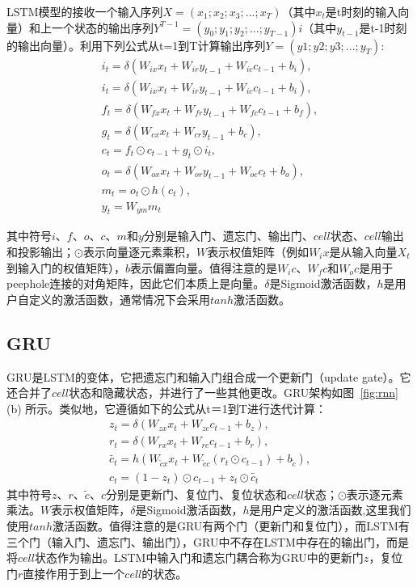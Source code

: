 LSTM模型的接收一个输入序列$X=(x_1;x_2;x_3;...;x_T)$（其中$x_t$是t时刻的输入向量）和上一个状态的输出序列$Y^{T-1}=(y_0;y_1;y_2;...;y_{T-1})i$（其中$y_{t-1}$是t-1时刻的输出向量）。利用下列公式从t=1到T计算输出序列$Y=(y1;y2;y3;...;y_T)$:
\begin{gather}
i_t=\delta (W_{ix}x_t + W_{ir}y_{t-1} + W_{ic}c_{t-1} + b_i), \\
i_t=\delta (W_{ix}x_t + W_{ir}y_{t-1} + W_{ic}c_{t-1} + b_i), \\
f_t=\delta (W_{fx}x_t + W_{fr}y_{t-1} + W_{fc}c_{t-1} + b_f), \\
g_t=\delta (W_{cx}x_t + W_{cr}y_{t-1} + b_c), \\
c_t=f_t \odot c_{t-1} + g_t \odot i_t, \\
o_t=\delta (W_{ox}x_t + W_{or}y_{t-1} + W_{oc}c_{t} + b_o), \\
m_t=o_t \odot h(c_t), \\
y_t=W_{ym}m_t 
\end{gather}

其中符号$i$、$f$、$o$、$c$、$m$和$y$分别是输入门、遗忘门、输出门、$cell$状态、$cell$输出和投影输出；$\odot$表示向量逐元素乘积，$W$表示权值矩阵（例如$W_ix$是从输入向量$X_t$到输入门的权值矩阵），$b$表示偏置向量。值得注意的是$W_ic$、$W_fc$和$W_oc$是用于peephole连接的对角矩阵，因此它们本质上是向量。$\delta$是Sigmoid激活函数，$h$是用户自定义的激活函数，通常情况下会采用$tanh$激活函数。

\subsection{GRU}
GRU是LSTM的变体，它把遗忘门和输入门组合成一个更新门（update gate）。它还合并了$cell$状态和隐藏状态，并进行了一些其他更改。GRU架构如图~\ref{fig:rnn} (b) 所示。类似地，它遵循如下的公式从t＝1到T进行迭代计算：
\begin{gather}
z_t=\delta(W_{zx}x_t+W_{zc}c_{t-1}+b_z),\\
r_t=\delta(W_{rx}x_t+W_{rc}c_{t-1}+b_r),\\
\tilde{c_t}=h(W_{\tilde{c}x}x_t+W_{\tilde{c}c}(r_t \odot c_{t-1}) + b_{\tilde{c}}),\\
c_t=(1-z_t) \odot c_{t-1} + z_t \odot \tilde{c_t}
\end{gather}
其中符号$z$、$r$、$\tilde{c}$、$c$分别是更新门、复位门、复位状态和$cell$状态；$\odot$表示逐元素乘法。$W$表示权值矩阵，$\delta$是Sigmoid激活函数，$h$是用户定义的激活函数,这里我们使用$tanh$激活函数。值得注意的是GRU有两个门（更新门和复位门），而LSTM有三个门（输入门、遗忘门、输出门），GRU中不存在LSTM中存在的输出门，而是将$cell$状态作为输出。LSTM中输入门和遗忘门耦合称为GRU中的更新门$z$，复位门$r$直接作用于到上一个$cell$的状态。 


